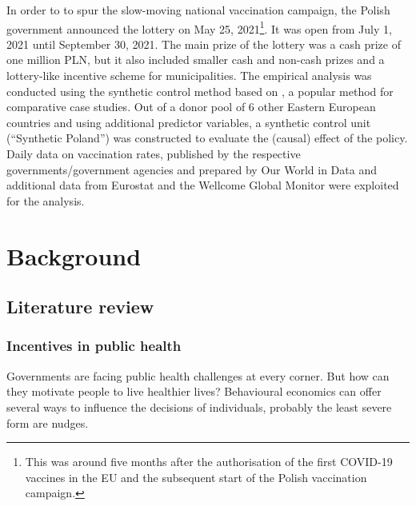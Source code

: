 \documentclass{scrbook}
\begin{document}
In order to to spur the slow-moving national vaccination campaign, the
Polish government announced the lottery on May 25,
2021\footnote{This was around five months after the authorisation of the first COVID-19 vaccines in the EU and the subsequent start of the Polish vaccination campaign.}.
It was open from July 1, 2021 until September 30, 2021. The main prize
of the lottery was a cash prize of one million PLN, but it also included
smaller cash and non-cash prizes and a lottery-like incentive scheme for
municipalities. The empirical analysis was conducted using the synthetic
control method based on \textcite{abadie_economic_2003}, a popular
method for comparative case studies. Out of a donor pool of 6 other
Eastern European countries and using additional predictor variables, a
synthetic control unit (``Synthetic Poland'') was constructed to
evaluate the (causal) effect of the policy. Daily data on vaccination
rates, published by the respective governments/government agencies and
prepared by Our World in Data and additional data from Eurostat and the
Wellcome Global Monitor were exploited for the analysis.

\chapter{Background}

\section{Literature review}

\subsection*{Incentives in public health}

Governments are facing public health challenges at every corner. But how
can they motivate people to live healthier lives? Behavioural economics
can offer several ways to influence the decisions of individuals,
probably the least severe form are nudges.
\end{document}
